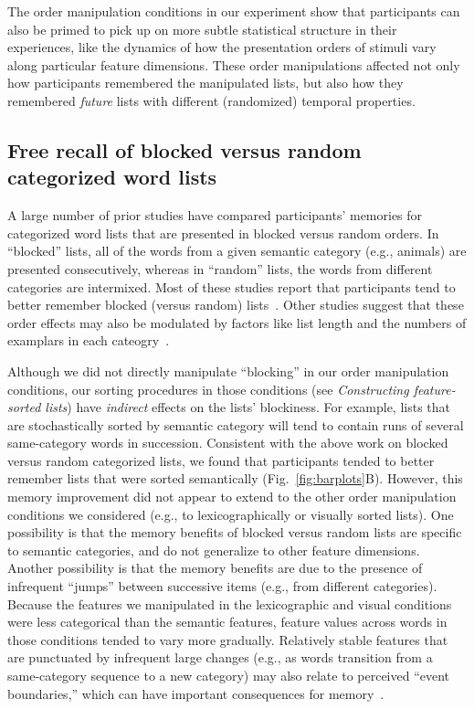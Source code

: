 \documentclass[11pt]{article}
\begin{document}
The order manipulation conditions in our experiment show that participants can
also be primed to pick up on more subtle statistical structure in their
experiences, like the dynamics of how the presentation orders of stimuli vary
along particular feature dimensions. These order manipulations affected not
only how participants remembered the manipulated lists, but also how they
remembered \textit{future} lists with different (randomized) temporal
properties.

\subsection*{Free recall of blocked versus random categorized word lists}

A large number of prior studies have compared participants' memories for
categorized word lists that are presented in blocked versus random orders. In
``blocked'' lists, all of the words from a given semantic category (e.g.,
animals) are presented consecutively, whereas in ``random'' lists, the words
from different categories are intermixed. Most of these studies report that
participants tend to better remember blocked (versus random)
lists~\citep{CofeEtal66, DAgo69, Dall64, Shap70, ShapPalm70, Kint70,
BoweEtal68, BoweEtal69, LuekEtal71, Puff74}. Other studies suggest that these order
effects may also be modulated by factors like list length and the numbers of
examplars in each cateogry~\citep[e.g.,][]{BorgMang72}.

Although we did not directly manipulate ``blocking'' in our order manipulation
conditions, our sorting procedures in those conditions (see
\textit{Constructing feature-sorted lists}) have \textit{indirect} effects on
the lists' blockiness. For example, lists that are stochastically sorted by
semantic category will tend to contain runs of several same-category words in
succession. Consistent with the above work on blocked versus random categorized
lists, we found that participants tended to better remember lists that were
sorted semantically (Fig.~\ref{fig:barplots}B). However, this memory
improvement did not appear to extend to the other order manipulation conditions
we considered (e.g., to lexicographically or visually sorted lists). One
possibility is that the memory benefits of blocked versus random lists are
specific to semantic categories, and do not generalize to other feature
dimensions. Another possibility is that the memory benefits are due to the
presence of infrequent ``jumps'' between successive items (e.g., from different
categories). Because the features we manipulated in the lexicographic and
visual conditions were less categorical than the semantic features, feature
values across words in those conditions tended to vary more gradually.
Relatively stable features that are punctuated by infrequent large changes
(e.g., as words transition from a same-category sequence to a new category) may
also relate to perceived ``event boundaries,'' which can have important
consequences for memory~\citep{RadvZack17, DuBrEtal17, DuBrDava16, DuBrDava13}.
\end{document}
